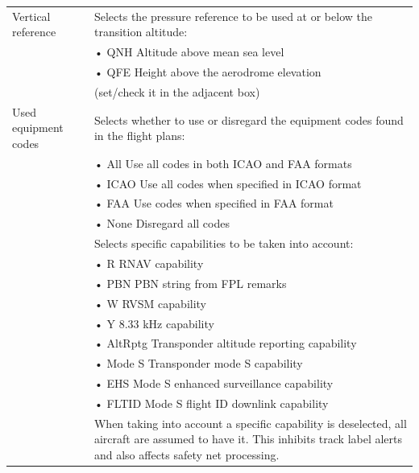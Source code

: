 \documentclass[a4paper,oneside,11pt]{memoir}
\begin{document}
\bigskip

\begin{longtable}{p{5cm} p{7.5cm}}
  Vertical reference      & Selects the pressure reference to be used at or below the transition altitude:\\      & \hspace{10pt}• QNH Altitude above mean sea level\\                          & \hspace{10pt}• QFE Height above the aerodrome elevation\\                                                 & (set/check it in the adjacent box)\\
  Used equipment codes    & Selects whether to use or disregard the equipment codes found in the flight plans:\\  & \hspace{10pt}• All Use all codes in both ICAO and FAA formats\\             & \hspace{10pt}• ICAO Use all codes when specified in ICAO format\\                                         & \hspace{10pt}• FAA Use codes when specified in FAA format\\                          & \hspace{10pt}• None Disregard all codes\\ & \hspace{10pt}Selects specific capabilities to be taken into account:\\ & \hspace{10pt}• R RNAV capability\\ & \hspace{10pt}• PBN PBN string from FPL remarks\\ & \hspace{10pt}• W RVSM capability\\ & \hspace{10pt}• Y 8.33 kHz capability\\ & \hspace{10pt}• AltRptg Transponder altitude reporting capability\\ & \hspace{10pt}• Mode S Transponder mode S capability\\ & \hspace{10pt}• EHS Mode S enhanced surveillance capability\\ & \hspace{10pt}• FLTID Mode S flight ID downlink capability\\ & When taking into account a specific capability is deselected, all aircraft are assumed to have it. This inhibits track label alerts and also affects safety net processing. \\

\end{longtable}
\end{document}
